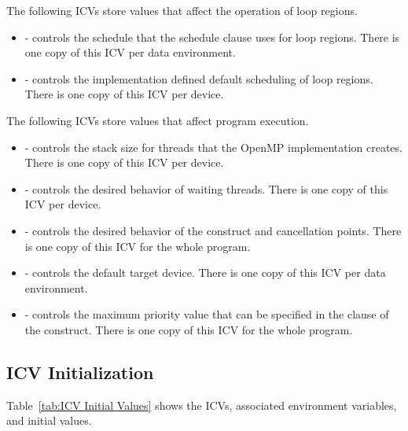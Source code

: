 The following ICVs store values that affect the operation of loop regions.

\begin{itemize}
\item {} - controls the schedule that the  schedule clause uses for 
loop regions. There is one copy of this ICV per data environment.

\item {} - controls the implementation defined default scheduling of loop 
regions. There is one copy of this ICV per device. 
\end{itemize}

The following ICVs store values that affect program execution.

\begin{itemize}
\item {} - controls the stack size for threads that the OpenMP implementation 
creates. There is one copy of this ICV per device. 

\item {} - controls the desired behavior of waiting threads. There is one copy 
of this ICV per device. 

\item {} - controls the desired behavior of the  construct and cancellation 
points. There is one copy of this ICV for the whole program.

\item {} - controls the default target device. There is one copy of this ICV 
per data environment.

\item {} - controls the maximum priority value that can be specified in the
 clause of the  construct. There is one copy of this ICV for the whole program.

\end{itemize}






\subsection{ICV Initialization}
\label{subsec:ICV Initialization}
Table~\ref{tab:ICV Initial Values} shows the ICVs, associated 
environment variables, and initial values.


